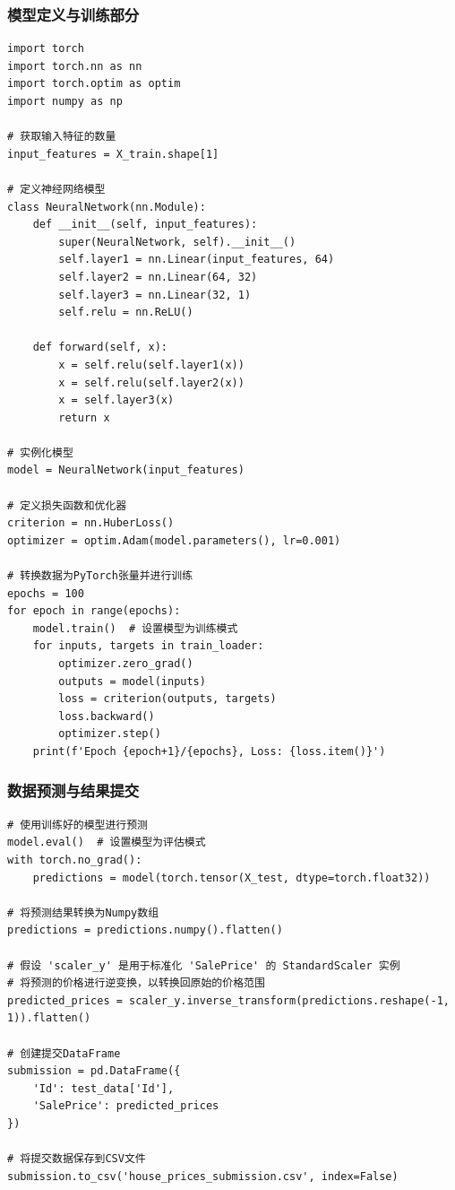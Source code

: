 \documentclass[a4paper,12pt]{article}
\begin{document}
\subsubsection{模型定义与训练部分}
\begin{lstlisting}
import torch
import torch.nn as nn
import torch.optim as optim
import numpy as np

# 获取输入特征的数量
input_features = X_train.shape[1]

# 定义神经网络模型
class NeuralNetwork(nn.Module):
    def __init__(self, input_features):
        super(NeuralNetwork, self).__init__()
        self.layer1 = nn.Linear(input_features, 64)
        self.layer2 = nn.Linear(64, 32)
        self.layer3 = nn.Linear(32, 1)
        self.relu = nn.ReLU()
    
    def forward(self, x):
        x = self.relu(self.layer1(x))
        x = self.relu(self.layer2(x))
        x = self.layer3(x)
        return x

# 实例化模型
model = NeuralNetwork(input_features)

# 定义损失函数和优化器
criterion = nn.HuberLoss()
optimizer = optim.Adam(model.parameters(), lr=0.001)

# 转换数据为PyTorch张量并进行训练
epochs = 100
for epoch in range(epochs):
    model.train()  # 设置模型为训练模式
    for inputs, targets in train_loader:
        optimizer.zero_grad()
        outputs = model(inputs)
        loss = criterion(outputs, targets)
        loss.backward()
        optimizer.step()
    print(f'Epoch {epoch+1}/{epochs}, Loss: {loss.item()}')

\end{lstlisting}

\subsubsection{数据预测与结果提交}
\begin{lstlisting}
# 使用训练好的模型进行预测
model.eval()  # 设置模型为评估模式
with torch.no_grad():
    predictions = model(torch.tensor(X_test, dtype=torch.float32))

# 将预测结果转换为Numpy数组
predictions = predictions.numpy().flatten()

# 假设 'scaler_y' 是用于标准化 'SalePrice' 的 StandardScaler 实例
# 将预测的价格进行逆变换，以转换回原始的价格范围
predicted_prices = scaler_y.inverse_transform(predictions.reshape(-1, 1)).flatten()

# 创建提交DataFrame
submission = pd.DataFrame({
    'Id': test_data['Id'],
    'SalePrice': predicted_prices
})

# 将提交数据保存到CSV文件
submission.to_csv('house_prices_submission.csv', index=False)
\end{lstlisting}
\end{document}
